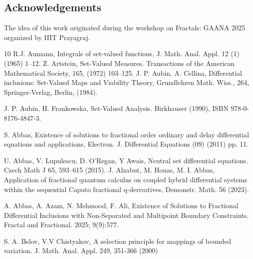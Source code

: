 \documentclass[a4paper,12pt,reqno]{amsart}
\numberwithin{equation}{section}
\theoremstyle{definition}
\theoremstyle{remark}
\numberwithin{equation}{section}
\begin{document}
\subsection*{Acknowledgements} The idea of this work originated during the workshop on Fractals: GAANA 2025 organized by IIIT Prayagraj.




  

\begin{thebibliography}{10}
 R.J. Aumann, Integrals of set-valued functions, J. Math. Anal. Appl. 12 (1) (1965) 1–12.
 Z. Artstein, Set-Valued Measures. Transactions of the American Mathematical Society, 165,  (1972) 103–125.
 J. P. Aubin, A.  Cellina,  Differential inclusions: Set-Valued Maps and Viability Theory, Grundlehren Math. Wiss., 264, Springer-Verlag, Berlin, (1984).

 J. P. Aubin,  H.  Frankowska, Set-Valued Analysis. Birkhauser (1990), ISBN
978-0-8176-4847-3.

 S. Abbas, Existence of solutions to fractional order ordinary and delay differential equations and applications, Electron. J. Differential Equations (09) (2011) pp. 11.

 U. Abbas, V. Lupulescu, D. O’Regan, Y Awais,  Neutral set differential equations. Czech Math J 65, 593–615 (2015). 
  J. Alzabut, M. Houas,  M. I. Abbas, Application of fractional quantum calculus on coupled hybrid differential systems within the sequential Caputo fractional  q-derivatives, Demonstr. Math. 56 (2023).

 A. Abbas, A. Azam, N. Mehmood, F. Ali, Existence of Solutions to Fractional Differential Inclusions with Non-Separated and Multipoint Boundary Constraints. Fractal and Fractional. 2025; 9(9):577.

  S. A. Belov, V.V Chistyakov, A selection principle for mappings of bounded variation. J. Math. Anal. Appl. 249, 351-366 (2000)


\end{thebibliography}
\end{document}
